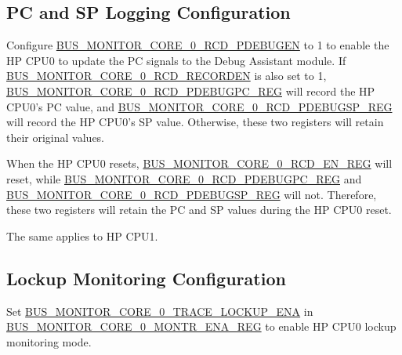 \documentclass[main\_\_EN.tex]{subfiles}
\begin{document}
\subsection{PC and SP Logging Configuration}

Configure \hyperref[fielddesc:BUSMONITORCORE0RCDPDEBUGEN]{BUS\_MONITOR\_CORE\_0\_RCD\_PDEBUGEN} to 1 to enable the HP CPU0 to update the PC signals to the Debug Assistant module. If \hyperref[fielddesc:BUSMONITORCORE0RCDRECORDEN]{BUS\_MONITOR\_CORE\_0\_RCD\_RECORDEN} is also set to 1, \hyperref[regdesc:BUSMONITORCORE0RCDPDEBUGPCREG]{BUS\_MONITOR\_CORE\_0\_RCD\_PDEBUGPC\_REG} will record the HP CPU0's PC value, and \hyperref[regdesc:BUSMONITORCORE0RCDPDEBUGSPREG]{BUS\_MONITOR\_CORE\_0\_RCD\_PDEBUGSP\_REG} will record the HP CPU0's SP value. Otherwise, these two registers will retain their original values.

When the HP CPU0 resets, \hyperref[regdesc:BUSMONITORCORE0RCDENREG]{BUS\_MONITOR\_CORE\_0\_RCD\_EN\_REG} will reset, while \hyperref[regdesc:BUSMONITORCORE0RCDPDEBUGPCREG]{BUS\_MONITOR\_CORE\_0\_RCD\_PDEBUGPC\_REG} and \hyperref[regdesc:BUSMONITORCORE0RCDPDEBUGSPREG]{BUS\_MONITOR\_CORE\_0\_RCD\_PDEBUGSP\_REG} will not. Therefore, these two registers will retain the PC and SP values during the HP CPU0 reset.

The same applies to HP CPU1.

\subsection{Lockup Monitoring Configuration}

Set \hyperref[fielddesc:BUSMONITORCORE0TRACELOCKUPENA]{BUS\_MONITOR\_CORE\_0\_TRACE\_LOCKUP\_ENA} in \hyperref[regdesc:BUSMONITORCORE0MONTRENAREG]{BUS\_MONITOR\_CORE\_0\_MONTR\_ENA\_REG} to enable HP CPU0 lockup monitoring mode.
\end{document}

